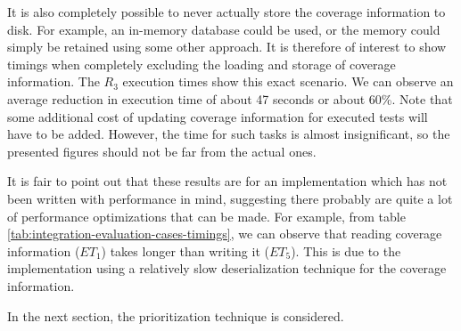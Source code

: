 \documentclass[a4paper,english,12pt]{report}
\begin{document}
It is also completely possible to never actually store the coverage information to disk. For example, an in-memory database could be used, or the memory could simply be retained using some other approach. It is therefore of interest to show timings when completely excluding the loading and storage of coverage information. The $R_3$ execution times show this exact scenario. We can observe an average reduction in execution time of about 47 seconds or about 60\%. Note that some additional cost of updating coverage information for executed tests will have to be added. However, the time for such tasks is almost insignificant, so the presented figures should not be far from the actual ones. 

It is fair to point out that these results are for an implementation which has not been written with performance in mind, suggesting there probably are quite a lot of performance optimizations that can be made. For example, from table \vref{tab:integration-evaluation-cases-timings}, we can observe that reading coverage information ($\mathit{ET}_1$) takes longer than writing it ($\mathit{ET}_5$). This is due to the implementation using a relatively slow deserialization technique for the coverage information.

In the next section, the prioritization technique is considered.
\end{document}
